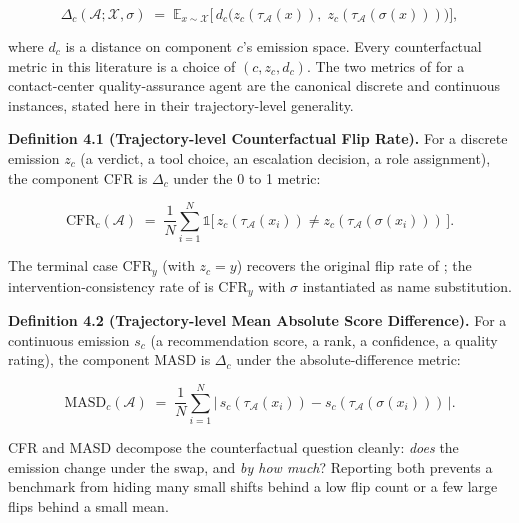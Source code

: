 \documentclass[acmsmall,nonacm]{acmart}
\begin{document}
\begin{equation*}
\Delta_c(\mathcal{A}; \mathcal{X}, \sigma) \;=\; \mathbb{E}_{x \sim \mathcal{X}} \Big[ \, d_c\big( z_c(\tau_{\mathcal{A}}(x)), \; z_c(\tau_{\mathcal{A}}(\sigma(x))) \big) \Big],
\end{equation*}

where $d_c$ is a distance on component $c$'s emission space. Every counterfactual metric in this literature is a choice of $(c, z_c, d_c)$. The two metrics of \cite{mayilvaghanan2026counterfactual} for a contact-center quality-assurance agent are the canonical discrete and continuous instances, stated here in their trajectory-level generality.

\textbf{Definition 4.1 (Trajectory-level Counterfactual Flip Rate).} For a discrete emission $z_c$ (a verdict, a tool choice, an escalation decision, a role assignment), the component CFR is $\Delta_c$ under the 0 to 1 metric:

\begin{equation*}
\mathrm{CFR}_c(\mathcal{A}) \;=\; \frac{1}{N} \sum_{i=1}^{N} \mathbb{1}\big[\, z_c(\tau_{\mathcal{A}}(x_i)) \neq z_c(\tau_{\mathcal{A}}(\sigma(x_i))) \,\big].
\end{equation*}

The terminal case $\mathrm{CFR}_y$ (with $z_c = y$) recovers the original flip rate of \cite{mayilvaghanan2026counterfactual}; the intervention-consistency rate of \cite{basu2026names} is $\mathrm{CFR}_y$ with $\sigma$ instantiated as name substitution.

\textbf{Definition 4.2 (Trajectory-level Mean Absolute Score Difference).} For a continuous emission $s_c$ (a recommendation score, a rank, a confidence, a quality rating), the component MASD is $\Delta_c$ under the absolute-difference metric:

\begin{equation*}
\mathrm{MASD}_c(\mathcal{A}) \;=\; \frac{1}{N} \sum_{i=1}^{N} \big| \, s_c(\tau_{\mathcal{A}}(x_i)) - s_c(\tau_{\mathcal{A}}(\sigma(x_i))) \, \big|.
\end{equation*}

CFR and MASD decompose the counterfactual question cleanly: \emph{does} the emission change under the swap, and \emph{by how much}? Reporting both prevents a benchmark from hiding many small shifts behind a low flip count or a few large flips behind a small mean.
\end{document}
